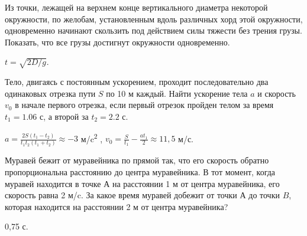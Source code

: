 \begin{ex} %
Из точки, лежащей на верхнем конце вертикального диаметра некоторой окружности, по желобам, установленным вдоль различных хорд этой окружности, одновременно начинают скользить под действием силы тяжести без трения грузы. Показать, что все грузы достигнут окружности одновременно.
\begin{ans}
$t = \sqrt{2D/g}$.
\end{ans}
\end{ex}

\complexProblems

\begin{ex} %
Тело, двигаясь с постоянным ускорением, проходит последовательно два одинаковых отрезка пути $S$ по 10 м каждый. Найти ускорение тела $a$ и скорость $v_0$ в начале первого отрезка, если первый отрезок пройден телом за время $t_1 = 1.06$ с, а второй за $t_2 = 2.2$ с.
\begin{ans}
$a = \frac{2S\left(t_1-t_2\right)}{t_1t_2\left(t_1+t_2\right)} \approx -3$ м/c\textsuperscript{2} , $v_0 = \frac{S}{t_1}-\frac{at_1}{2} \approx 11,5$ м/с.
\end{ans}
\end{ex}

\begin{ex} %
Муравей бежит от муравейника по прямой так, что его скорость обратно пропорциональна расстоянию до центра муравейника. В тот момент, когда муравей находится в точке $А$ на расстоянии 1 м от центра муравейника, его скорость равна 2 м/c. За какое время муравей добежит от точки А до точки $B$, которая находится на расстоянии 2 м от центра муравейника?
\begin{ans}
0,75 с.
\end{ans}
\end{ex}

\clearpage